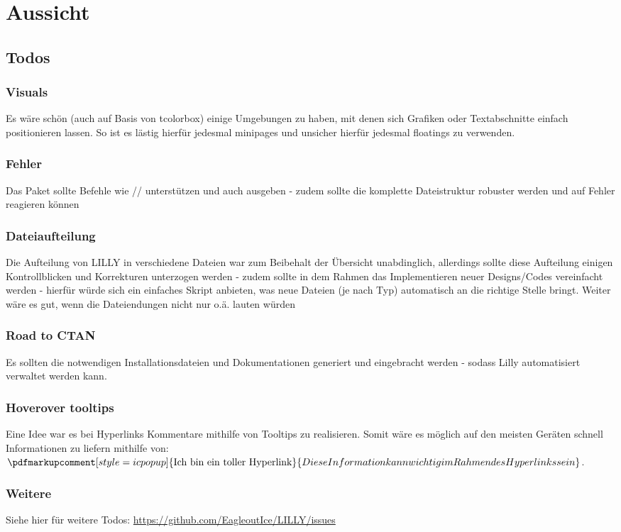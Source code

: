 \chapter{Aussicht}

\section{Todos}
\subsection{Visuals}
Es wäre schön (auch auf Basis von tcolorbox) einige Umgebungen zu haben, mit denen sich Grafiken oder Textabschnitte einfach positionieren lassen. So ist es lästig hierfür jedesmal minipages und unsicher hierfür jedesmal floatings zu verwenden.
\subsection{Fehler}
Das Paket sollte Befehle wie // unterstützen und auch ausgeben - zudem sollte die komplette Dateistruktur robuster werden und auf Fehler reagieren können
\subsection{Dateiaufteilung}
Die Aufteilung von LILLY in verschiedene Dateien war zum Beibehalt der Übersicht unabdinglich, allerdings sollte diese Aufteilung einigen Kontrollblicken und Korrekturen unterzogen werden - zudem sollte in dem Rahmen das Implementieren neuer Designs/Codes vereinfacht werden - hierfür würde sich ein einfaches Skript anbieten, was neue Dateien (je nach Typ) automatisch an die richtige Stelle bringt. Weiter wäre es gut, wenn die Dateiendungen nicht nur  o.ä. lauten würden
\subsection{Road to CTAN}
Es sollten die notwendigen Installationsdateien und Dokumentationen generiert und eingebracht werden - sodass Lilly automatisiert verwaltet werden kann.

\subsection{Hoverover tooltips}

Eine Idee war es bei Hyperlinks Kommentare mithilfe von Tooltips zu realisieren. Somit wäre es möglich auf den meisten Geräten schnell Informationen zu liefern mithilfe von: $\pdfmarkupcomment[style=icpopup]{\text{Ich bin ein toller Hyperlink}}{Diese Information kann wichtig im Rahmen des Hyperlinks sein}$.

\subsection{Weitere}
Siehe hier für weitere Todos: \url{https://github.com/EagleoutIce/LILLY/issues}